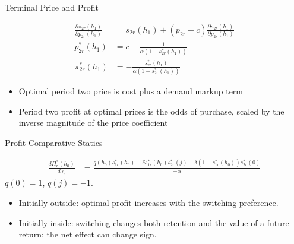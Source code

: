 \gdef\shortbuttons{\hyperlink{short-10}{\beamergotobutton{Back}}}
\begin{frame}[label=short-9,noframenumbering]{Terminal Price and Profit}
  \begingroup
  \setlength{\jot}{7pt}

    \begin{align*}
      \frac{\partial\pi_{2r}(h_1)}{\partial p_{2r}(h_1)} &= s_{2r}(h_1) + (p_{2r} - c)\frac{\partial s_{2r}(h_1)}{\partial p_{2r}(h_1)} \\
      p_{2r}^*(h_1)&= c - \frac{1}{\alpha(1-s_{2r}^*(h_1))} \\
      \pi_{2r}^*(h_1) &= -\frac{s_{2r}^*(h_1)}{\alpha(1-s_{2r}^*(h_1))}
    \end{align*}
  \endgroup
  \begin{itemize}
    \item Optimal period two price is cost plus a demand markup term
    \item Period two profit at optimal prices is the odds of purchase, scaled by the inverse magnitude of the price coefficient
  \end{itemize}
\end{frame}



\gdef\shortbuttons{\hyperlink{short-comp-stat}{\beamergotobutton{Back}}}
\begin{frame}[label=short-11,noframenumbering]{Profit Comparative Statics}
  \begingroup
  \setlength{\jot}{7pt}

    \begin{align*}
      \frac{d\Pi_r^*(h_0)}{d\gamma_r} &= \frac{q(h_0)s_{1r}^*(h_0) - \delta s_{1r}^*(h_0)s_{2r}^*(j) + \delta(1-s_{1r}^*(h_0))s_{2r}^*(0)}{-\alpha}
    \end{align*}
  \endgroup
  {\small $q(0)=1$, $q(j)=-1$.}
  \begin{itemize}
    \item Initially outside: optimal profit increases with the switching preference.
    \item Initially inside: switching changes both retention and the value of a future return; the net effect can change sign.
  \end{itemize}
\end{frame}



